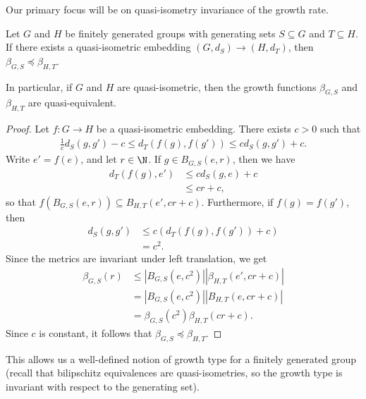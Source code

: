 \documentclass[10pt]{mypackage}
\begin{document}
Our primary focus will be on quasi-isometry invariance of the growth rate.
\begin{proposition}
  Let $G$ and $H$ be finitely generated groups with generating sets $S\subseteq G$ and $T\subseteq H$. If there exists a quasi-isometric embedding $\left( G,d_S \right)\rightarrow \left( H,d_T \right)$, then $\beta_{G,S}\preceq \beta_{H,T}$.

  In particular, if $G$ and $H$ are quasi-isometric, then the growth functions $\beta_{G,S}$ and $\beta_{H,T}$ are quasi-equivalent.
\end{proposition}
\begin{proof}
  Let $f\colon G\rightarrow H$ be a quasi-isometric embedding. There exists $c > 0$ such that
  \begin{align*}
    \frac{1}{c}d_S\left( g,g' \right) - c \leq d_T\left( f(g),f(g') \right) \leq cd_S\left( g,g' \right) + c.
  \end{align*}
  Write $e' = f(e)$, and let $r\in \N$. If $g\in B_{G,S}\left( e,r \right)$, then we have
  \begin{align*}
    d_T\left( f(g),e' \right) &\leq cd_S\left( g,e \right) + c\\
                              &\leq cr + c,
  \end{align*}
  so that $f\left( B_{G,S}\left( e,r \right) \right) \subseteq B_{H,T}\left( e',cr+c \right)$. Furthermore, if $f(g) = f(g')$, then
  \begin{align*}
    d_S\left( g,g' \right) &\leq c\left( d_T\left( f(g),f(g') \right) + c \right)\\
                           &= c^2.
  \end{align*}
  Since the metrics are invariant under left translation, we get
  \begin{align*}
    \beta_{G,S}\left( r \right) &\leq \left\vert B_{G,S}\left( e,c^2 \right) \right\vert\left\vert \beta_{H,T}\left( e',cr+c \right) \right\vert\\
                                &= \left\vert B_{G,S}\left( e,c^2 \right) \right\vert\left\vert B_{H,T}\left( e,cr+c \right) \right\vert\\
                                &= \beta_{G,S}\left( c^2 \right)\beta_{H,T}\left( cr+c \right).
  \end{align*}
  Since $c$ is constant, it follows that $\beta_{G,S}\preceq \beta_{H,T}$.
\end{proof}
This allows us a well-defined notion of growth type for a finitely generated group (recall that bilipschitz equivalences are quasi-isometries, so the growth type is invariant with respect to the generating set).
\end{document}
